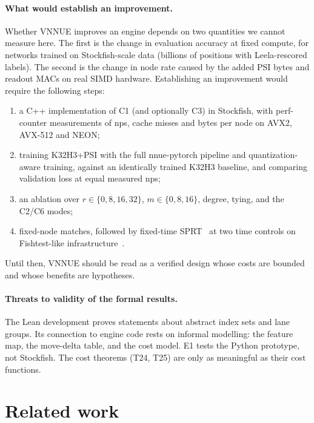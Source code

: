 \paragraph{What would establish an improvement.}
Whether VNNUE improves an engine depends on two quantities we cannot measure here.
The first is the change in evaluation accuracy at fixed compute, for networks trained on Stockfish-scale data (billions of positions with Leela-rescored labels).
The second is the change in node rate caused by the added PSI bytes and readout MACs on real SIMD hardware.
Establishing an improvement would require the following steps:
\begin{enumerate}[leftmargin=*,itemsep=1pt]
\item a C++ implementation of C1 (and optionally C3) in Stockfish, with perf-counter measurements of nps, cache misses and bytes per node on AVX2, AVX-512 and NEON;
\item training K32H3+PSI with the full nnue-pytorch pipeline and quantization-aware training, against an identically trained K32H3 baseline, and comparing validation loss at equal measured nps;
\item an ablation over $r\in\{0,8,16,32\}$, $m\in\{0,8,16\}$, degree, tying, and the C2/C6 modes;
\item fixed-node matches, followed by fixed-time SPRT~\cite{wald1945} at two time controls on Fishtest-like infrastructure~\cite{fishtest}.
\end{enumerate}
Until then, VNNUE should be read as a verified design whose costs are bounded and whose benefits are hypotheses.

\paragraph{Threats to validity of the formal results.}
The Lean development proves statements about abstract index sets and lane groups.
Its connection to engine code rests on informal modelling: the feature map, the move-delta table, and the cost model.
E1 tests the Python prototype, not Stockfish.
The cost theorems (T24, T25) are only as meaningful as their cost functions.

\section{Related work}\label{sec:related}

